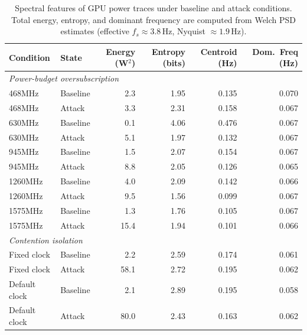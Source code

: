 \begin{table}[t]
\centering
\footnotesize
\caption{Spectral features of GPU power traces under baseline and attack conditions. Total energy, entropy, and dominant frequency are computed from Welch PSD estimates (effective $f_s \approx 3.8$\,Hz, Nyquist $\approx 1.9$\,Hz).}
\label{tab:fft_features}
\begin{tabular}{llrrrr}
\toprule
Condition & State & Energy (W$^2$) & Entropy (bits) & Centroid (Hz) & Dom.\ Freq (Hz) \\
\midrule
\multicolumn{6}{l}{\textit{Power-budget oversubscription}} \\
  468MHz & Baseline & 2.3 & 1.95 & 0.135 & 0.070 \\
  468MHz & Attack & 3.3 & 2.31 & 0.158 & 0.067 \\
  630MHz & Baseline & 0.1 & 4.06 & 0.476 & 0.067 \\
  630MHz & Attack & 5.1 & 1.97 & 0.132 & 0.067 \\
  945MHz & Baseline & 1.5 & 2.07 & 0.154 & 0.067 \\
  945MHz & Attack & 8.8 & 2.05 & 0.126 & 0.065 \\
  1260MHz & Baseline & 4.0 & 2.09 & 0.142 & 0.066 \\
  1260MHz & Attack & 9.5 & 1.56 & 0.099 & 0.067 \\
  1575MHz & Baseline & 1.3 & 1.76 & 0.105 & 0.067 \\
  1575MHz & Attack & 15.4 & 1.94 & 0.101 & 0.066 \\
\midrule
\multicolumn{6}{l}{\textit{Contention isolation}} \\
  Fixed clock & Baseline & 2.2 & 2.59 & 0.174 & 0.061 \\
  Fixed clock & Attack & 58.1 & 2.72 & 0.195 & 0.062 \\
  Default clock & Baseline & 2.1 & 2.89 & 0.195 & 0.058 \\
  Default clock & Attack & 80.0 & 2.43 & 0.163 & 0.062 \\
\bottomrule
\end{tabular}
\end{table}
